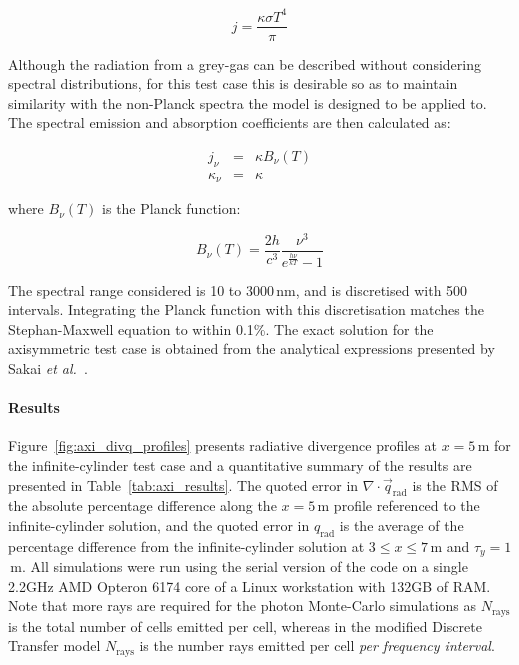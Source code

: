 \begin{equation}
 j = \frac{\kappa \sigma T^{4}}{\pi}
 \label{eq:grey_emission}
\end{equation}


Although the radiation from a grey-gas can be described without considering spectral distributions, for this test case this is desirable so as to maintain similarity with the non-Planck spectra the model is designed to be applied to.
The spectral emission and absorption coefficients are then calculated as:

\begin{eqnarray}
      j_{\nu} &=& \kappa B_{\nu}(T) \\
 \kappa_{\nu} &=& \kappa 
\end{eqnarray}

\noindent where $B_{\nu}(T)$ is the Planck function:

\begin{equation}
 B_{\nu}(T) = \frac{2 h}{c^3} \frac{\nu^3}{e^\frac{h \nu }{k T} -1 }
\end{equation}

The spectral range considered is 10 to 3000\,nm, and is discretised with 500 intervals.
Integrating the Planck function with this discretisation matches the Stephan-Maxwell equation to within 0.1\%.
The exact solution for the axisymmetric test case is obtained from the analytical expressions presented by Sakai \textit{et al.}~\cite{SSM1998}.

\paragraph{Results}

Figure~\ref{fig:axi_divq_profiles} presents radiative divergence profiles at $x=5$\,m for the infinite-cylinder test case and a quantitative summary of the results are presented in Table~\ref{tab:axi_results}.
The quoted error in $\nabla \cdot \vec{q}_\text{rad}$ is the RMS of the absolute percentage difference along the $x=5$\,m profile referenced to the infinite-cylinder solution, and the quoted error in $q_\text{rad}$ is the average of the percentage difference from the infinite-cylinder solution at $3 \leq x \leq 7$\,m and $\tau_y=1$\,m.
All simulations were run using the serial version of the code on a single 2.2GHz AMD Opteron 6174 core of a Linux workstation with 132GB of RAM.
Note that more rays are required for the photon Monte-Carlo simulations as $N_\text{rays}$ is the total number of cells emitted per cell, whereas in the modified Discrete Transfer model $N_\text{rays}$ is the number rays emitted per cell \textit{per frequency interval}.

